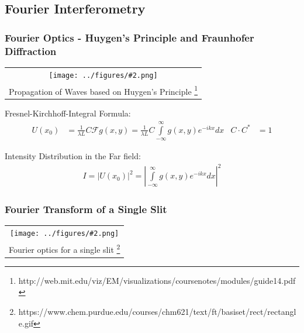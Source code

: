 \documentclass[10pt]{beamer}
\newcommand{\gra}[3][]{
	\begin{table}
	\centering
	\begin{tabular}[width=\textwidth]{c}
		\texttt{[image: ../figures/\#2.png]}\\
		\small #3
	\end{tabular}
	\end{table}
}
\begin{document}
\subsection{Fourier Interferometry}
\frame{\tableofcontents[currentsubsection]}
\begin{frame}
	\frametitle{Fourier Optics - Huygen's Principle and Fraunhofer Diffraction}
	\gra[0.4]{Huygen}{Propagation of Waves based on Huygen's Principle \footnote{http://web.mit.edu/viz/EM/visualizations/coursenotes/modules/guide14.pdf}}
		Fresnel-Kirchhoff-Integral Formula:
		\begin{align}
		U(x_0) &= \frac{1}{\lambda L} C \mathscr{F}{g(x, y)}    = \frac{1}{\lambda L} C   \int\limits_{-\infty}^{\infty}  g(x,y)e^{-ikx}dx    &  C  \cdot C^* &= 1       
		\end{align}
		
		Intensity Distribution in the Far field:
		\begin{align}
		I=|U(x_0)|^2=\left| \int\limits_{-\infty}^{\infty} g(x,y)e^{-ikx}dx \right|^2
		\end{align}
\end{frame}

\begin{frame}
	\frametitle{Fourier Transform of a Single Slit}
\gra[0.8]{Einzelspalt}{Fourier optics for a single slit \footnote{https://www.chem.purdue.edu/courses/chm621/text/ft/basiset/rect/rectangle.gif}}
\end{frame}
\end{document}
